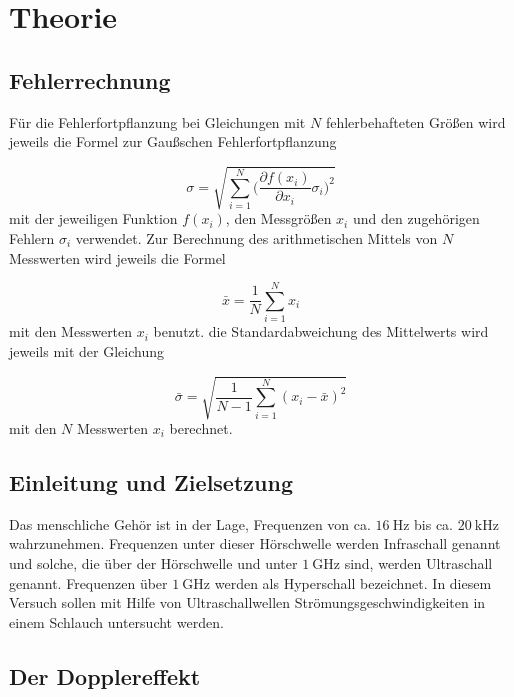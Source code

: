 \section{Theorie}
\label{sec:Theorie}

\subsection{Fehlerrechnung}

Für die Fehlerfortpflanzung bei Gleichungen mit $N$ fehlerbehafteten Größen
wird jeweils die Formel zur Gaußschen Fehlerfortpflanzung

\begin{equation}
  \sigma = \sqrt{\sum_{i=1}^{N}\biggl(\frac{\partial f(x_i)}{\partial x_i}
  \sigma_i\biggr)^2}
\end{equation}
mit der jeweiligen Funktion $f(x_i)$, den Messgrößen $x_i$ und den
zugehörigen Fehlern $\sigma_i$ verwendet.
Zur Berechnung des arithmetischen Mittels von $N$ Messwerten wird jeweils die
Formel

\begin{equation}
  \bar{x} = \frac{1}{N}\sum_{i=1}^{N}x_i
\end{equation}
mit den Messwerten $x_i$ benutzt.
die Standardabweichung des Mittelwerts wird jeweils mit der Gleichung

\begin{equation}
  \bar{\sigma} = \sqrt{\frac{1}{N-1}\sum_{i=1}^{N}(x_i - \bar{x})^2}
\end{equation}
mit den $N$ Messwerten $x_i$ berechnet.

\subsection{Einleitung und Zielsetzung}

Das menschliche Gehör ist in der Lage, Frequenzen von ca. $\SI{16}{\hertz}$ bis
ca. $\SI{20}{\kilo\hertz}$ wahrzunehmen. Frequenzen unter dieser Hörschwelle
werden Infraschall genannt und solche, die über der Hörschwelle und unter
$\SI{1}{\giga\hertz}$ sind, werden Ultraschall genannt.
Frequenzen über $\SI{1}{\giga\hertz}$ werden als Hyperschall bezeichnet.
In diesem Versuch sollen mit Hilfe von Ultraschallwellen
Strömungsgeschwindigkeiten in einem Schlauch untersucht werden.

\subsection{Der Dopplereffekt}

